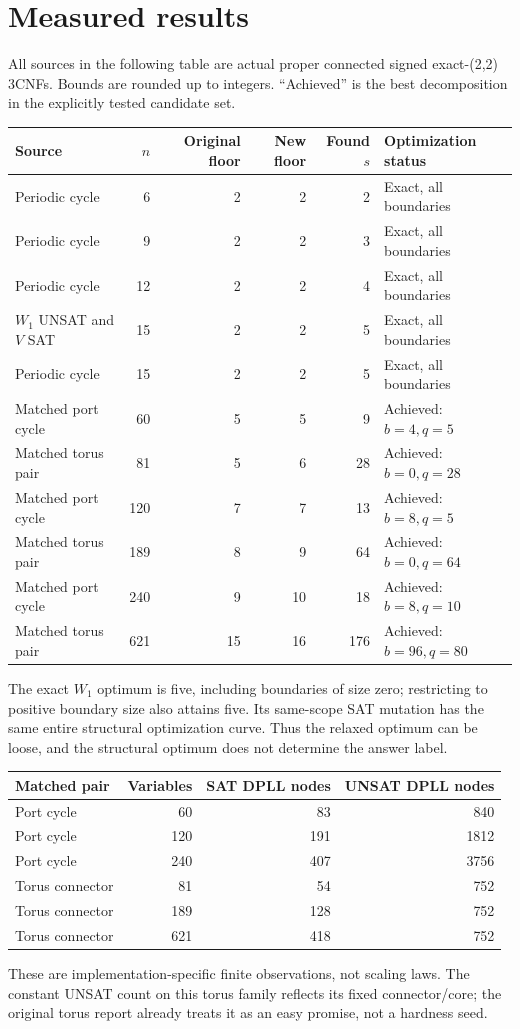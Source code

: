 \documentclass[11pt]{article}
\begin{document}
\section{Measured results}
All sources in the following table are actual proper connected signed exact-(2,2) 3CNFs. Bounds are rounded up to integers. ``Achieved'' is the best decomposition in the explicitly tested candidate set.

\begin{center}\small
\begin{tabular}{lrrrrl}\toprule
Source & $n$ & Original floor & New floor & Found $s$ & Optimization status\\\midrule
Periodic cycle &6&2&2&2&Exact, all boundaries\\
Periodic cycle &9&2&2&3&Exact, all boundaries\\
Periodic cycle &12&2&2&4&Exact, all boundaries\\
$W_1$ UNSAT and $V$ SAT &15&2&2&5&Exact, all boundaries\\
Periodic cycle &15&2&2&5&Exact, all boundaries\\
Matched port cycle &60&5&5&9&Achieved: $b=4,q=5$\\
Matched torus pair &81&5&6&28&Achieved: $b=0,q=28$\\
Matched port cycle &120&7&7&13&Achieved: $b=8,q=5$\\
Matched torus pair &189&8&9&64&Achieved: $b=0,q=64$\\
Matched port cycle &240&9&10&18&Achieved: $b=8,q=10$\\
Matched torus pair &621&15&16&176&Achieved: $b=96,q=80$\\\bottomrule
\end{tabular}\normalsize\end{center}

The exact $W_1$ optimum is five, including boundaries of size zero; restricting to positive boundary size also attains five. Its same-scope SAT mutation has the same entire structural optimization curve. Thus the relaxed optimum can be loose, and the structural optimum does not determine the answer label.

\begin{center}\begin{tabular}{lrrr}\toprule
Matched pair & Variables & SAT DPLL nodes & UNSAT DPLL nodes\\\midrule
Port cycle &60&83&840\\
Port cycle &120&191&1812\\
Port cycle &240&407&3756\\
Torus connector &81&54&752\\
Torus connector &189&128&752\\
Torus connector &621&418&752\\\bottomrule
\end{tabular}\end{center}
These are implementation-specific finite observations, not scaling laws. The constant UNSAT count on this torus family reflects its fixed connector/core; the original torus report already treats it as an easy promise, not a hardness seed.
\end{document}
